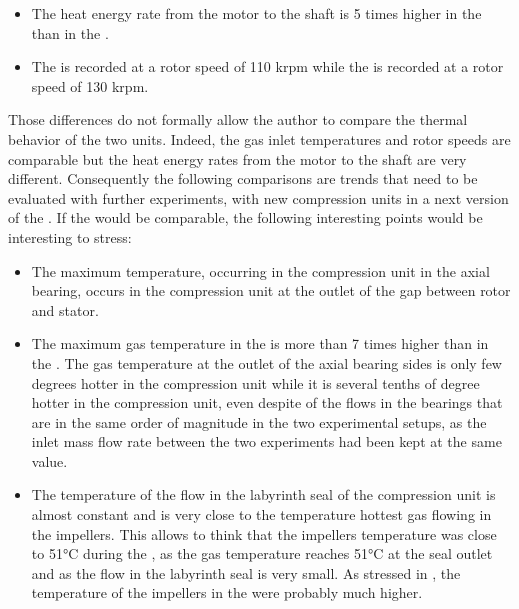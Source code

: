 \begin{itemize}
\item The heat energy rate from the motor to the shaft is 5 times
  higher in the \AWP{} \OP{} than in the \BWP{} \OP{}.
\item The \BWP{} \OP{} is recorded at a rotor speed of 110 krpm while
  the \AWP{} \OP{} is recorded at a rotor speed of 130 krpm.
\end{itemize}

Those differences do not formally allow the author to compare the
thermal behavior of the two units. Indeed, the gas inlet temperatures
and rotor speeds are comparable but the heat energy rates from the
motor to the shaft are very different. Consequently the following
comparisons are trends that need to be evaluated with further
experiments, with new compression units in a next version of the
\BWP{}. If the \OP{} would be comparable, the following interesting
points would be interesting to stress:

\begin{itemize}
\item The maximum temperature, occurring in the \AWP{} compression unit
  in the axial bearing, occurs in the \BWP{} compression unit at the
  outlet of the gap between rotor and stator.
\item The maximum gas temperature in the \AWP{} is more than 7 times
  higher than in the \BWP{}. The gas temperature at the outlet of the
  axial bearing sides is only few degrees hotter in the \BWP{}
  compression unit while it is several tenths of degree hotter in the
  \AWP{} compression unit, even despite of the flows in the bearings
  that are in the same order of magnitude in the two experimental
  setups, as the inlet mass flow rate between the two experiments had
  been kept at the same value.
\item The temperature of the flow in the labyrinth seal of the \BWP{}
  compression unit is almost constant and is very close to the
  temperature hottest gas flowing in the impellers. This allows to
  think that the impellers temperature was close to
  \num{51}\si{\degreeCelsius} during the \BWP{} \OP{}, as the gas
  temperature reaches \num{51}\si{\degreeCelsius} at the seal outlet
  and as the flow in the labyrinth seal is very small. As stressed in
  , the temperature of the impellers in
  the \AWP{} were probably much higher.
\end{itemize}

